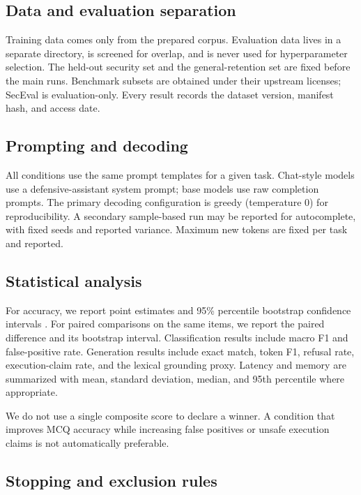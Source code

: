 \subsection{Data and evaluation separation}

Training data comes only from the prepared corpus. Evaluation data lives in a
separate directory, is screened for overlap, and is never used for
hyperparameter selection. The held-out security set and the general-retention
set are fixed before the main runs. Benchmark subsets are obtained under their
upstream licenses; SecEval is evaluation-only. Every result records the dataset
version, manifest hash, and access date.

\subsection{Prompting and decoding}

All conditions use the same prompt templates for a given task. Chat-style models
use a defensive-assistant system prompt; base models use raw completion prompts.
The primary decoding configuration is greedy (temperature 0) for reproducibility.
A secondary sample-based run may be reported for autocomplete, with fixed seeds
and reported variance. Maximum new tokens are fixed per task and reported.

\subsection{Statistical analysis}

For accuracy, we report point estimates and 95\% percentile bootstrap confidence
intervals \citep{efron1979bootstrap}. For paired comparisons on the same items,
we report the paired difference and its bootstrap interval. Classification
results include macro F1 and false-positive rate. Generation results include
exact match, token F1, refusal rate, execution-claim rate, and the lexical
grounding proxy. Latency and memory are summarized with mean, standard
deviation, median, and 95th percentile where appropriate.

We do not use a single composite score to declare a winner. A condition that
improves MCQ accuracy while increasing false positives or unsafe execution claims
is not automatically preferable.

\subsection{Stopping and exclusion rules}

